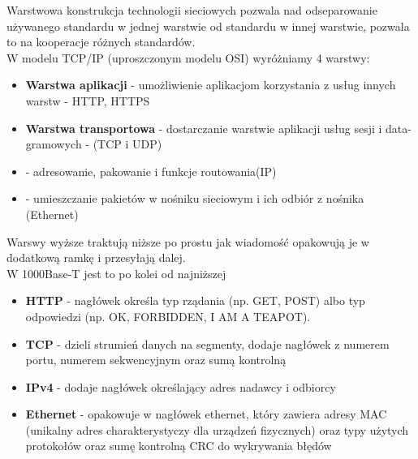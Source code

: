 Warstwowa konstrukcja technologii sieciowych pozwala nad odseparowanie używanego standardu w jednej warstwie od standardu w innej warstwie, pozwala to na kooperacje różnych standardów. \\ 
W modelu TCP/IP (uproszczonym modelu OSI) wyróżniamy 4 warstwy:
\begin{itemize}
  \item \textbf{Warstwa aplikacji} - umożliwienie aplikacjom korzystania z usług innych warstw - HTTP, HTTPS
  \item \textbf{Warstwa transportowa} - dostarczanie warstwie aplikacji usług sesji i data-gramowych - (TCP i UDP)
  \item {} - adresowanie, pakowanie i funkcje routowania(IP)
  \item {} - umieszczanie pakietów w nośniku sieciowym i ich odbiór z nośnika (Ethernet)
\end{itemize}
Warswy wyższe traktują niższe po prostu jak wiadomość opakowują je w dodatkową ramkę i przesyłają dalej. \\
W 1000Base-T jest to po kolei od najniższej
\begin{itemize}
  \item \textbf{HTTP} - nagłówek określa typ rządania (np. GET, POST) albo typ odpowiedzi (np. OK, FORBIDDEN, I AM A TEAPOT).
  \item \textbf{TCP}  - dzieli strumień danych na segmenty, dodaje nagłówek z numerem portu, numerem sekwencyjnym oraz sumą kontrolną 
  \item \textbf{IPv4} - dodaje nagłówek określający adres nadawcy i odbiorcy
  \item \textbf{Ethernet} - opakowuje w nagłówek ethernet, który zawiera adresy MAC (unikalny adres charakterystyczy dla urządzeń fizycznych) oraz typy użytych protokołów oraz sumę kontrolną CRC do wykrywania błędów
\end{itemize}
